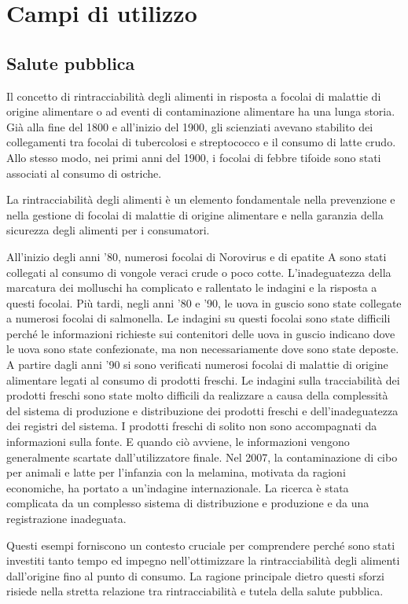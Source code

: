 \section{Campi di utilizzo}
\subsection{Salute pubblica}

Il concetto di rintracciabilità degli alimenti in risposta a focolai di malattie di origine alimentare o ad eventi di contaminazione alimentare ha una lunga storia. Già alla fine del 1800 e all'inizio del 1900, gli scienziati avevano stabilito dei collegamenti tra focolai di tubercolosi e streptococco e il consumo di latte crudo. Allo stesso modo, nei primi anni del 1900, i focolai di febbre tifoide sono stati associati al consumo di ostriche.

La rintracciabilità degli alimenti è un elemento fondamentale nella prevenzione e nella gestione di focolai di malattie di origine alimentare e nella garanzia della sicurezza degli alimenti per i consumatori.

All'inizio degli anni '80, numerosi focolai di Norovirus e di epatite A sono stati collegati al consumo di vongole veraci crude o poco cotte. L'inadeguatezza della marcatura dei molluschi ha complicato e rallentato le indagini e la risposta a questi focolai. Più tardi, negli anni '80 e '90, le uova in guscio sono state collegate a numerosi focolai di salmonella. Le indagini su questi focolai sono state difficili perché le informazioni richieste sui contenitori delle uova in guscio indicano dove le uova sono state confezionate, ma non necessariamente dove sono state deposte. A partire dagli anni '90 si sono verificati numerosi focolai di malattie di origine alimentare legati al consumo di prodotti freschi. Le indagini sulla tracciabilità dei prodotti freschi sono state molto difficili da realizzare a causa della complessità del sistema di produzione e distribuzione dei prodotti freschi e dell'inadeguatezza dei registri del sistema. I prodotti freschi di solito non sono accompagnati da informazioni sulla fonte. E quando ciò avviene, le informazioni vengono generalmente scartate dall'utilizzatore finale. Nel 2007, la contaminazione di cibo per animali e latte per l'infanzia con la melamina, motivata da ragioni economiche, ha portato a un'indagine internazionale. La ricerca è stata complicata da un complesso sistema di distribuzione e produzione e da una registrazione inadeguata.

Questi esempi forniscono un contesto cruciale per comprendere perché sono stati investiti tanto tempo ed impegno nell'ottimizzare la rintracciabilità degli alimenti dall'origine fino al punto di consumo. La ragione principale dietro questi sforzi risiede nella stretta relazione tra rintracciabilità e tutela della salute pubblica.

